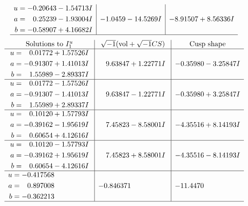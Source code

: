 \documentclass[1p]{elsarticle_modified}
\theoremstyle{definition}
\newcommand{\I}{\sqrt{-1}}
\begin{document}
$$\begin{array}{c|c|c}
\begin{aligned}
u &= -0.20643 - 1.54713 I \\
a &= \phantom{-}0.25239 - 1.93004 I \\
b &= -0.58907 + 4.16682 I\end{aligned}
 & -1.0459 - 14.5269 I & -8.91507 + 8.56336 I\\
 \hline 
 \end{array}$$\newpage$$\begin{array}{c|c|c}  
\text{Solutions to }I^u_{1}& \I (\text{vol} + \sqrt{-1}CS) & \text{Cusp shape}\\
 \hline 
\begin{aligned}
u &= \phantom{-}0.01772 + 1.57526 I \\
a &= -0.91307 + 1.41013 I \\
b &= \phantom{-}1.55989 - 2.89337 I\end{aligned}
 & \phantom{-}9.63847 + 1.22771 I & -0.35980 - 3.25847 I \\ \hline\begin{aligned}
u &= \phantom{-}0.01772 - 1.57526 I \\
a &= -0.91307 - 1.41013 I \\
b &= \phantom{-}1.55989 + 2.89337 I\end{aligned}
 & \phantom{-}9.63847 - 1.22771 I & -0.35980 + 3.25847 I \\ \hline\begin{aligned}
u &= \phantom{-}0.10120 + 1.57793 I \\
a &= -0.39162 - 1.95619 I \\
b &= \phantom{-}0.60654 + 4.12616 I\end{aligned}
 & \phantom{-}7.45823 - 8.58001 I & -4.35516 + 8.14193 I \\ \hline\begin{aligned}
u &= \phantom{-}0.10120 - 1.57793 I \\
a &= -0.39162 + 1.95619 I \\
b &= \phantom{-}0.60654 - 4.12616 I\end{aligned}
 & \phantom{-}7.45823 + 8.58001 I & -4.35516 - 8.14193 I \\ \hline\begin{aligned}
u &= -0.417568\phantom{ +0.000000I} \\
a &= \phantom{-}0.897008\phantom{ +0.000000I} \\
b &= -0.362213\phantom{ +0.000000I}\end{aligned}
 & -0.846371\phantom{ +0.000000I} & -11.4470\phantom{ +0.000000I}\\
 \hline 
 \end{array}$$\newpage\newpage\renewcommand{\arraystretch}{1}
\end{document}
